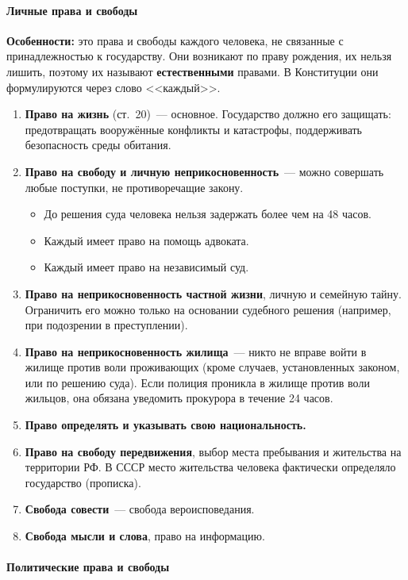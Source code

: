 \documentclass[12pt]{article}
\begin{document}
	\paragraph{Личные права и свободы}
	
	\textbf{Особенности:} это права и свободы каждого человека, не связанные с принадлежностью к государству. Они возникают по праву рождения, их нельзя лишить, поэтому их называют \textbf{естественными} правами. В Конституции они формулируются через слово <<каждый>>.
	
	\begin{enumerate}
		\item \textbf{Право на жизнь} (ст.~20)~--- основное. Государство должно его защищать: предотвращать вооружённые конфликты и катастрофы, поддерживать безопасность среды обитания.
		\item \textbf{Право на свободу и личную неприкосновенность}~--- можно совершать любые поступки, не противоречащие закону.
		\begin{itemize}
			\item До решения суда человека нельзя задержать более чем на 48 часов.
			\item Каждый имеет право на помощь адвоката.
			\item Каждый имеет право на независимый суд.
		\end{itemize}
		\item \textbf{Право на неприкосновенность частной жизни}, личную и семейную тайну. Ограничить его можно только на основании судебного решения (например, при подозрении в преступлении).
		\item \textbf{Право на неприкосновенность жилища}~--- никто не вправе войти в жилище против воли проживающих (кроме случаев, установленных законом, или по решению суда). Если полиция проникла в жилище против воли жильцов, она обязана уведомить прокурора в течение 24 часов.
		\item \textbf{Право определять и указывать свою национальность.}
		\item \textbf{Право на свободу передвижения}, выбор места пребывания и жительства на территории РФ. В СССР место жительства человека фактически определяло государство (прописка).
		\item \textbf{Свобода совести}~--- свобода вероисповедания.
		\item \textbf{Свобода мысли и слова}, право на информацию.
	\end{enumerate}
	
	\paragraph{Политические права и свободы}
	
\end{document}
